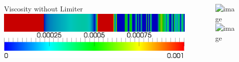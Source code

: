 \documentclass[8pt,xcolor=svgnames]{beamer}
\begin{document}
\begin{frame}
\begin{columns}
\begin{column}{0.3\textwidth}
\begin{figure}[t]
\begin{center}
Viscosity without Limiter
\includegraphics[width=1.0\textwidth]{figs/Sod/Q4nl-50-viscosity.png}
\end{center}
\end{figure}
\end{column}
\begin{column}{0.7\textwidth}
\begin{center}
\includegraphics<1>[width=0.8\textwidth]{figs/Sod/Q4-50-Density.png}
\includegraphics<2>[width=0.8\textwidth]{figs/Sod/Q4-50-Density-zoom.png}
\end{center}
\end{column}
\end{columns}
\end{frame}

\end{document}
